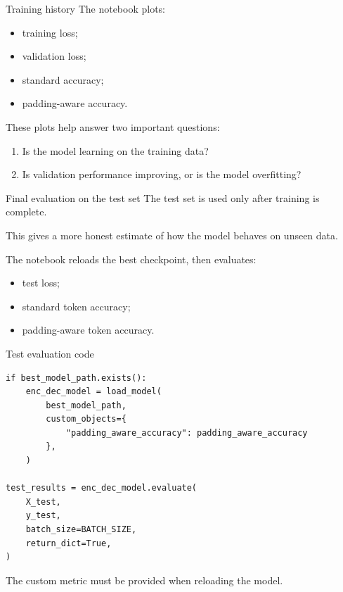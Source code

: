 \documentclass[aspectratio=169]{beamer}
\begin{document}
%
\begin{frame}[fragile]{Training history}
The notebook plots:
\begin{itemize}
    \item training loss;
    \item validation loss;
    \item standard accuracy;
    \item padding-aware accuracy.
\end{itemize}

\vspace{0.3cm}
These plots help answer two important questions:
\begin{enumerate}
    \item Is the model learning on the training data?
    \item Is validation performance improving, or is the model overfitting?
\end{enumerate}
\end{frame}
%
%
\begin{frame}[fragile]{Final evaluation on the test set}
The test set is used only after training is complete.

\vspace{0.3cm}
This gives a more honest estimate of how the model behaves on unseen data.

\vspace{0.3cm}
The notebook reloads the best checkpoint, then evaluates:
\begin{itemize}
    \item test loss;
    \item standard token accuracy;
    \item padding-aware token accuracy.
\end{itemize}
\end{frame}
%
%
\begin{frame}[fragile]{Test evaluation code}
\begin{lstlisting}
if best_model_path.exists():
    enc_dec_model = load_model(
        best_model_path,
        custom_objects={
            "padding_aware_accuracy": padding_aware_accuracy
        },
    )

test_results = enc_dec_model.evaluate(
    X_test,
    y_test,
    batch_size=BATCH_SIZE,
    return_dict=True,
)
\end{lstlisting}

The custom metric must be provided when reloading the model.
\end{frame}
\end{document}
